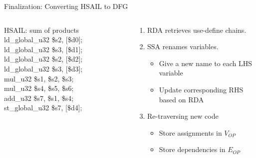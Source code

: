 \documentclass{beamer}
\begin{document}
\begin{CJK}{UTF8}{bkai}
            \begin{frame}{Finalization: Converting HSAIL to DFG}
                \begin{columns}
                    \begin{column}{0.45\textwidth}
                        \begin{block}{HSAIL: sum of products}
                            ld\_global\_u32 \$s2, [\$d0]; \\ 
                            ld\_global\_u32 \$s3, [\$d1]; \\ 
                            ld\_global\_u32 \$s2, [\$d2]; \\
                            ld\_global\_u32 \$s3, [\$d3]; \\
                            mul\_u32 \$s1, \$s2, \$s3; \\
                            mul\_u32 \$s4, \$s5, \$s6; \\
                            add\_u32 \$s7, \$s1, \$s4; \\
                            st\_global\_u32 \$s7, [\$d4]; \\
                        \end{block} 
                    \end{column}
                    \begin{column}{0.55\textwidth}
                        \begin{enumerate}
                            \item <2->{RDA retrieves use-define chains.}
                            \item <3->{SSA renames variables.
                                \begin{itemize}
                                    \item Give a new name to each LHS variable
                                    \item Update corresponding RHS based on RDA
                                \end{itemize}
                            }
                        \item <4->{Re-traversing new code
                                \begin{itemize}
                                    \item Store assignments in $V_{OP}$
                                    \item Store dependencies in $E_{OP}$

\end{itemize}}
\end{enumerate}
\end{column}
\end{columns}
\end{frame}
\end{CJK}
\end{document}
